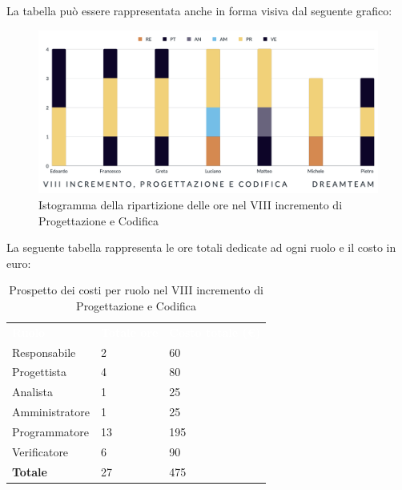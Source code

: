 La tabella può essere rappresentata anche in forma visiva dal seguente grafico:
\begin{figure}[H]
\centering
\includegraphics[scale=0.55]{Sezioni/SezioniPreventivo/grafici/Preventivo_progettazione_VIII.png}
\caption{Istogramma della ripartizione delle ore nel VIII incremento di Progettazione e Codifica}
\end{figure}

La seguente tabella rappresenta le ore totali dedicate ad ogni ruolo e il costo in euro:

\begin{table}[H]
\begin{center}
\renewcommand{\arraystretch}{1.5}
\begin{tabular}{ m{}<{\centering}  m{}<{\centering} m{}<{\centering}}
	\rowcolor{darkblue}
	\textcolor{white}{\textbf{Ruolo}}&\textcolor{white}{\textbf{Totale ore}}&\textcolor{white}{\textbf{Costo totale (\euro)}}\\ 

	Responsabile  & 2 & 60 \\	
	
	Progettista & 4 & 80 \\
	
	Analista & 1 & 25 \\

	Amministratore & 1 & 25 \\
	
	Programmatore & 13 & 195 \\
	
	Verificatore & 6 & 90 \\
	
	\textbf{Totale} & 27 & 475 \\
	
\end{tabular}
\caption{Prospetto dei costi per ruolo nel VIII incremento di Progettazione e Codifica}
\end{center}
\end{table}

